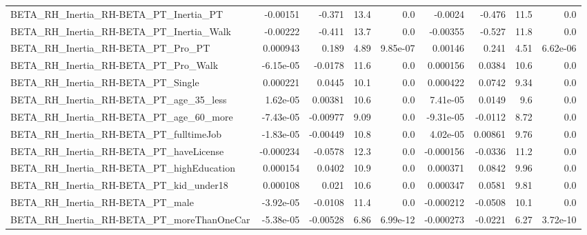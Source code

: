 \begin{tabular}{lrrrrrrrr}
BETA\_RH\_Inertia\_RH-BETA\_PT\_Inertia\_PT              &    -0.00151 &       -0.371 &     13.4 &      0.0 &    -0.0024 &      -0.476 &         11.5 &           0.0 \\
BETA\_RH\_Inertia\_RH-BETA\_PT\_Inertia\_Walk            &    -0.00222 &       -0.411 &     13.7 &      0.0 &   -0.00355 &      -0.527 &         11.8 &           0.0 \\
BETA\_RH\_Inertia\_RH-BETA\_PT\_Pro\_PT                  &    0.000943 &        0.189 &     4.89 & 9.85e-07 &    0.00146 &       0.241 &         4.51 &      6.62e-06 \\
BETA\_RH\_Inertia\_RH-BETA\_PT\_Pro\_Walk                &   -6.15e-05 &      -0.0178 &     11.6 &      0.0 &   0.000156 &      0.0384 &         10.6 &           0.0 \\
BETA\_RH\_Inertia\_RH-BETA\_PT\_Single                  &    0.000221 &       0.0445 &     10.1 &      0.0 &   0.000422 &      0.0742 &         9.34 &           0.0 \\
BETA\_RH\_Inertia\_RH-BETA\_PT\_age\_35\_less             &    1.62e-05 &      0.00381 &     10.6 &      0.0 &   7.41e-05 &      0.0149 &          9.6 &           0.0 \\
BETA\_RH\_Inertia\_RH-BETA\_PT\_age\_60\_more             &   -7.43e-05 &     -0.00977 &     9.09 &      0.0 &  -9.31e-05 &     -0.0112 &         8.72 &           0.0 \\
BETA\_RH\_Inertia\_RH-BETA\_PT\_fulltimeJob             &   -1.83e-05 &     -0.00449 &     10.8 &      0.0 &   4.02e-05 &     0.00861 &         9.76 &           0.0 \\
BETA\_RH\_Inertia\_RH-BETA\_PT\_haveLicense             &   -0.000234 &      -0.0578 &     12.3 &      0.0 &  -0.000156 &     -0.0336 &         11.2 &           0.0 \\
BETA\_RH\_Inertia\_RH-BETA\_PT\_highEducation           &    0.000154 &       0.0402 &     10.9 &      0.0 &   0.000371 &      0.0842 &         9.96 &           0.0 \\
BETA\_RH\_Inertia\_RH-BETA\_PT\_kid\_under18             &    0.000108 &        0.021 &     10.6 &      0.0 &   0.000347 &      0.0581 &         9.81 &           0.0 \\
BETA\_RH\_Inertia\_RH-BETA\_PT\_male                    &   -3.92e-05 &      -0.0108 &     11.4 &      0.0 &  -0.000212 &     -0.0508 &         10.1 &           0.0 \\
BETA\_RH\_Inertia\_RH-BETA\_PT\_moreThanOneCar          &   -5.38e-05 &     -0.00528 &     6.86 & 6.99e-12 &  -0.000273 &     -0.0221 &         6.27 &      3.72e-10 \\

\end{tabular}
